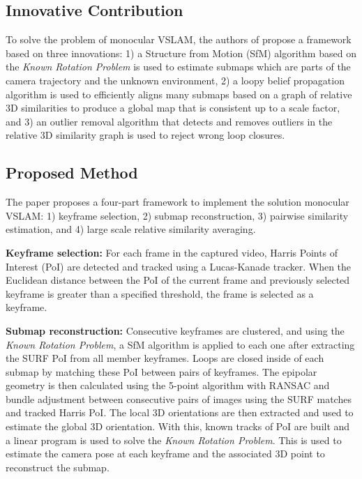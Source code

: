\documentclass[10pt,twocolumn,letterpaper]{article}
\begin{document}
\subsection{Innovative Contribution}
To solve the problem of monocular VSLAM, the authors of \cite{Bourmaud_2015_CVPR} propose a 
framework based on three innovations:
1) a Structure from Motion (SfM) algorithm based on the \textit{Known Rotation Problem} \cite{KRot}  
is used to estimate submaps which are parts of the camera trajectory and the unknown environment,
2) a loopy belief propagation algorithm is used to efficiently aligns many submaps based 
on a graph of relative 3D similarities to produce a global map that is consistent up to a scale factor, and
3) an outlier removal algorithm that detects and removes outliers in the relative 3D similarity 
graph is used to reject wrong loop closures.

\subsection{Proposed Method}
The paper proposes a four-part framework to implement the solution monocular VSLAM: 
1) keyframe selection, 2) submap reconstruction, 3) pairwise similarity estimation, and 4) large scale 
relative similarity averaging.

\textbf{Keyframe selection:} For each frame in the captured video, Harris Points of Interest 
(PoI) are detected and tracked using a Lucas-Kanade tracker. When the Euclidean distance between 
the PoI of the current frame and previously selected keyframe is greater than a specified threshold, the 
frame is selected as a keyframe.

\textbf{Submap reconstruction:} Consecutive keyframes are clustered, and using the 
\textit{Known Rotation Problem}, a SfM algorithm is applied to each one after extracting the SURF 
PoI \cite{Surf} from all member keyframes. Loops are closed inside of each submap by 
matching these PoI between pairs of keyframes. The epipolar geometry is then calculated 
using the 5-point algorithm with RANSAC and bundle adjustment \cite{5pt, Ransac} between consecutive pairs of images 
using the SURF matches and tracked Harris PoI. The local 3D orientations are then extracted and used to 
estimate the global 3D orientation. With this, known tracks of PoI are built and 
a linear program is used to solve the \textit{Known Rotation Problem}. 
This is used to estimate the camera pose at each 
keyframe and the associated 3D point to reconstruct the submap.
\end{document}
